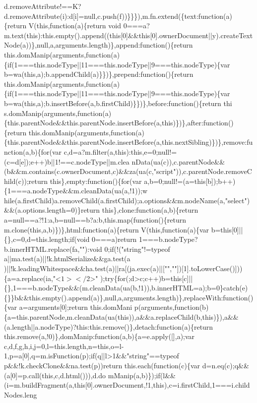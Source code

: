 \begin{DoxyCode}
{       d.removeAttribute!==K?d.removeAttribute(i):d[i]=null,c.push(f))\}\}\}),m.fn.extend(\{text:function(a)\{return V(this,function(a)\{return void
       0===a?m.text(this):this.empty().append((this[0]&&this[0].ownerDocument||y).createTextNode(a))\},null,a,arguments.length)\},append:function()\{return
       this.domManip(arguments,function(a)\{if(1===this.nodeType||11===this.nodeType||9===this.nodeType)\{var
       b=wa(this,a);b.appendChild(a)\}\})\},prepend:function()\{return
       this.domManip(arguments,function(a)\{if(1===this.nodeType||11===this.nodeType||9===this.nodeType)\{var b=wa(this,a);b.insertBefore(a,b.firstChild)\}\})\},before:function()\{return
       thi
      s.domManip(arguments,function(a)\{this.parentNode&&this.parentNode.insertBefore(a,this)\})\},after:function()\{return
       this.domManip(arguments,function(a)\{this.parentNode&&this.parentNode.insertBefore(a,this.nextSibling)\})\},remove:function(a,b)\{for(var
       c,d=a?m.filter(a,this):this,e=0;null!=(c=d[e]);e++)b||1!==c.nodeType||m.clea
      nData(ua(c)),c.parentNode&&(b&&m.contains(c.ownerDocument,c)&&za(ua(c,"script")),c.parentNode.removeChild(c));return this\},empty:function()\{for(var
       a,b=0;null!=(a=this[b]);b++)\{1===a.nodeType&&m.cleanData(ua(a,!1));w
      hile(a.firstChild)a.removeChild(a.firstChild);a.options&&m.nodeName(a,"select")&&(a.options.length=0)\}return this\},clone:function(a,b)\{return a=null==a?!1:a,b=null==b?a:b,this.map(function()\{return
       m.clone(this,a,b)\})\},html:function(a)\{return V(this,function(a)\{var b=this[0]||\{\},c=0,d=this.length;if(void 0===a)return
       1===b.nodeType?b.innerHTML.replace(fa,""):void 0;if(!("string"!=typeof
       a||ma.test(a)||!k.htmlSerialize&&ga.test(a
      )||!k.leadingWhitespace&&ha.test(a)||ra[(ja.exec(a)||["",""])[1].toLowerCase()]))\{a=a.replace(ia,"<$1></$2>"
      );try\{for(;d>c;c++)b=this[c]||\{\},1===b.nodeType&&(m.cleanData(ua(b,!1)),b.innerHTML=a);b=0\}catch(e)\{\}\}b&&this.empty().append(a)\},null,a,arguments.length)\},replaceWith:function()\{var a=arguments[0];return
       this.domMani
      p(arguments,function(b)\{a=this.parentNode,m.cleanData(ua(this)),a&&a.replaceChild(b,this)\}),a&&(a.length||a.nodeType)?this:this.remove()\},detach:function(a)\{return
       this.remove(a,!0)\},domManip:function(a,b)\{a=e.apply([],a);var c,d,f,g,h,i,j=0,l=this.length,n=this,o=l-1,p=a[0],q=m.isFunction(p);if(q||l>1&&"string"==typeof
       p&&!k.checkClone&&na.test(p))return this.each(function(c)\{var
       d=n.eq(c);q&&(a[0]=p.call(this,c,d.html())),d.do
      mManip(a,b)\});if(l&&(i=m.buildFragment(a,this[0].ownerDocument,!1,this),c=i.firstChild,1===i.childNodes.leng
}
\end{DoxyCode}
